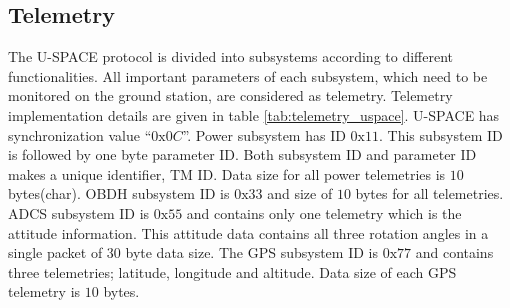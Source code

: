 \subsection{Telemetry}
\label{Number_of_telemetries}
The \ac{U-SPACE} protocol is divided into subsystems according to different functionalities. All important parameters of each subsystem, which need to be monitored on the ground station, are considered as telemetry. Telemetry implementation details are given in table \ref{tab:telemetry_uspace}. \ac{U-SPACE} has synchronization value ``$0\text{x}0C$''. Power subsystem has ID $0\text{x}11$. This subsystem ID is followed by one byte parameter ID. Both subsystem ID and parameter ID makes a unique identifier, TM ID. Data size for all power telemetries is $10$ bytes(char). \ac{OBDH} subsystem ID is $ 0\text{x}33 $ and size of $10$ bytes for all telemetries. \ac{ADCS} subsystem ID is $0\text{x}55$ and contains only one telemetry which is the attitude information. This attitude data contains all three rotation angles in a single packet of $30$ byte data size. The GPS subsystem ID is $ 0\text{x}77 $ and contains three telemetries; latitude, longitude and altitude. Data size of each GPS telemetry is $10$ bytes.

